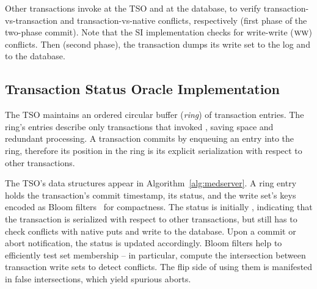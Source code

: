 Other transactions invoke  at the TSO and
 at the database, to verify transaction-vs-transaction
and transaction-vs-native conflicts, respectively (first phase of the two-phase
commit).
Note that the SI implementation checks for write-write ($\textsc{ww}$) conflicts.
Then (second phase), the transaction dumps its write set to the log and to the database.


\subsection{Transaction Status Oracle Implementation}
\label{sec:si:server}

The TSO %
maintains  an ordered circular buffer (\emph{ring}) of transaction entries. %
The ring's entries describe only transactions that invoked 
, saving space and redundant processing.
A transaction commits by enqueuing an entry into the ring, therefore its
 position in the ring is its explicit serialization with respect to other 
transactions.  

The TSO's data structures appear in  Algorithm~\ref{alg:medserver}. A ring entry 
holds the transaction's commit timestamp, its status, and the write set's keys 
encoded as Bloom filters~\cite{Bloom1970} for compactness. The status is initially 
, indicating that the transaction is serialized 
with respect to other transactions, but still has to check conflicts with native 
puts and write to the database. Upon a commit or abort notification,
the status is updated accordingly. Bloom filters help to efficiently 
test set membership -- in particular, compute the intersection between
transaction write sets to detect conflicts. The flip side of using them is
manifested in false intersections, which yield spurious aborts.

